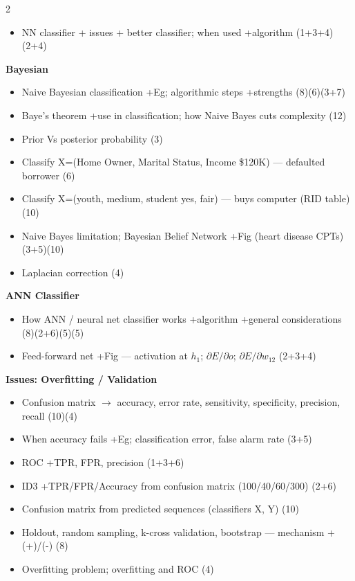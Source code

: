 \documentclass[10pt]{article}
\begin{document}
\begin{multicols}{2}
\begin{itemize}
  \item NN classifier + issues + better classifier; when used +algorithm \hfill (1+3+4)(2+4)
\end{itemize}
\textbf{Bayesian}
\begin{itemize}
  \item Naive Bayesian classification +Eg; algorithmic steps +strengths \hfill (8)(6)(3+7)
  \item Baye's theorem +use in classification; how Naive Bayes cuts complexity \hfill (12)
  \item Prior Vs posterior probability \hfill (3)
  \item Classify X=(Home Owner, Marital Status, Income \$120K) --- defaulted borrower \hfill (6)
  \item Classify X=(youth, medium, student yes, fair) --- buys computer (RID table) \hfill (10)
  \item Naive Bayes limitation; Bayesian Belief Network +Fig (heart disease CPTs) \hfill (3+5)(10)
  \item Laplacian correction \hfill (4)
\end{itemize}
\textbf{ANN Classifier}
\begin{itemize}
  \item How ANN / neural net classifier works +algorithm +general considerations \hfill (8)(2+6)(5)(5)
  \item Feed-forward net +Fig --- activation at $h_1$; $\partial E/\partial o$; $\partial E/\partial w_{12}$ \hfill (2+3+4)
\end{itemize}
\textbf{Issues: Overfitting / Validation}
\begin{itemize}
  \item Confusion matrix $\to$ accuracy, error rate, sensitivity, specificity, precision, recall \hfill (10)(4)
  \item When accuracy fails +Eg; classification error, false alarm rate \hfill (3+5)
  \item ROC +TPR, FPR, precision \hfill (1+3+6)
  \item ID3 +TPR/FPR/Accuracy from confusion matrix (100/40/60/300) \hfill (2+6)
  \item Confusion matrix from predicted sequences (classifiers X, Y) \hfill (10)
  \item Holdout, random sampling, k-cross validation, bootstrap --- mechanism +(+)/(-) \hfill (8)
  \item Overfitting problem; overfitting and ROC \hfill (4)
\end{itemize}


\end{multicols}
\end{document}
